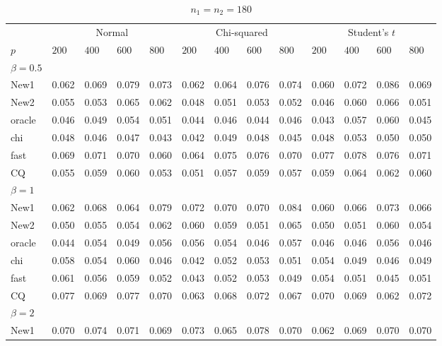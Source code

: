 \documentclass[review]{elsarticle}
\theoremstyle{plain}
\theoremstyle{definition}
\theoremstyle{remark}
\begin{document}
\begin{table}[ht]
\caption{$n_1=n_2=180$} 
\label{hahaha}
\vspace{3mm}
\centering
\begin{tabular}{lllllllllllll}
\toprule
    &   \multicolumn{4}{c}{Normal} & \multicolumn{4}{c}{Chi-squared}& \multicolumn{4}{c}{Student's $t$}  \\
    \cmidrule(r){2-5}
\cmidrule(r){6-9}
\cmidrule(r){10-13}
    $p$ & $200$ & $400$ & $600$ & $800$ & $200$ & $400$ & $600$ & $800$ & $200$ & $400$ & $600$ & $800$ \\ 
\midrule
    $\beta=0.5$\\
 New1 & 0.062 & 0.069 & 0.079 & 0.073 & 0.062 & 0.064 & 0.076 & 0.074 & 0.060 & 0.072 & 0.086 & 0.069 \\ 
New2 & 0.055 & 0.053 & 0.065 & 0.062 & 0.048 & 0.051 & 0.053 & 0.052 & 0.046 & 0.060 & 0.066 & 0.051 \\ 
oracle & 0.046 & 0.049 & 0.054 & 0.051 & 0.044 & 0.046 & 0.044 & 0.046 & 0.043 & 0.057 & 0.060 & 0.045 \\ 
chi & 0.048 & 0.046 & 0.047 & 0.043 & 0.042 & 0.049 & 0.048 & 0.045 & 0.048 & 0.053 & 0.050 & 0.050 \\ 
fast & 0.069 & 0.071 & 0.070 & 0.060 & 0.064 & 0.075 & 0.076 & 0.070 & 0.077 & 0.078 & 0.076 & 0.071 \\ 
CQ & 0.055 & 0.059 & 0.060 & 0.053 & 0.051 & 0.057 & 0.059 & 0.057 & 0.059 & 0.064 & 0.062 & 0.060 \\ 
    $\beta=1$\\
New1 & 0.062 & 0.068 & 0.064 & 0.079 & 0.072 & 0.070 & 0.070 & 0.084 & 0.060 & 0.066 & 0.073 & 0.066 \\ 
New2 & 0.050 & 0.055 & 0.054 & 0.062 & 0.060 & 0.059 & 0.051 & 0.065 & 0.050 & 0.051 & 0.060 & 0.054 \\ 
oracle & 0.044 & 0.054 & 0.049 & 0.056 & 0.056 & 0.054 & 0.046 & 0.057 & 0.046 & 0.046 & 0.056 & 0.046 \\ 
chi & 0.058 & 0.054 & 0.060 & 0.046 & 0.042 & 0.052 & 0.053 & 0.051 & 0.054 & 0.049 & 0.046 & 0.049 \\ 
fast & 0.061 & 0.056 & 0.059 & 0.052 & 0.043 & 0.052 & 0.053 & 0.049 & 0.054 & 0.051 & 0.045 & 0.051 \\ 
CQ & 0.077 & 0.069 & 0.077 & 0.070 & 0.063 & 0.068 & 0.072 & 0.067 & 0.070 & 0.069 & 0.062 & 0.072 \\ 
    $\beta=2$\\
New1 & 0.070 & 0.074 & 0.071 & 0.069 & 0.073 & 0.065 & 0.078 & 0.070 & 0.062 & 0.069 & 0.070 & 0.070 \\ 

\end{tabular}
\end{table}
\end{document}
